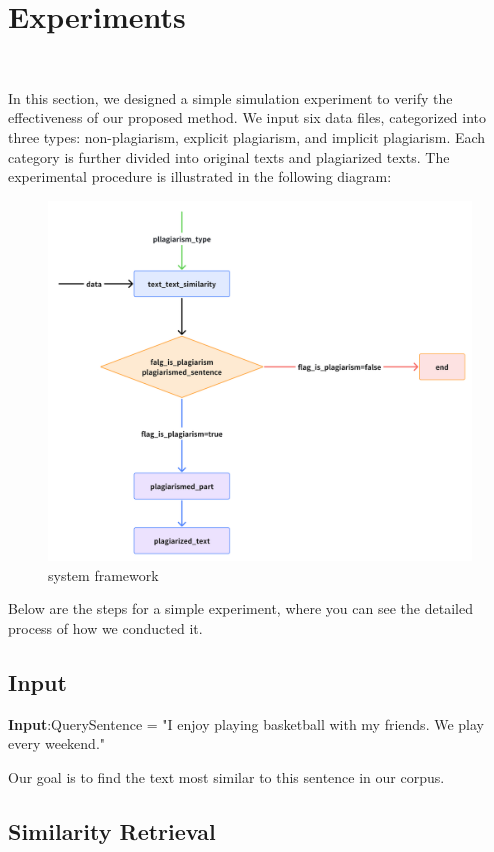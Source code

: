 \usepackage{listings}

\section{Experiments}
\

In this section, we designed a simple simulation experiment to verify the effectiveness of our proposed method. We input six data files, categorized into three types: non-plagiarism, explicit plagiarism, and implicit plagiarism. Each category is further divided into original texts and plagiarized texts. The experimental procedure is illustrated in the following diagram:
\begin{figure}[h]
    \centering
    \includegraphics[width=1\linewidth]{png/system.png}
    \caption{system framework}
    \label{fig:2}
\end{figure}

Below are the steps for a simple experiment, where you can see the detailed process of how we conducted it.

\subsection{Input}
\textbf{Input}:QuerySentence = "I enjoy playing basketball with my friends. We play every weekend."

Our goal is to find the text most similar to this sentence in our corpus.

\subsection{Similarity Retrieval}
\

